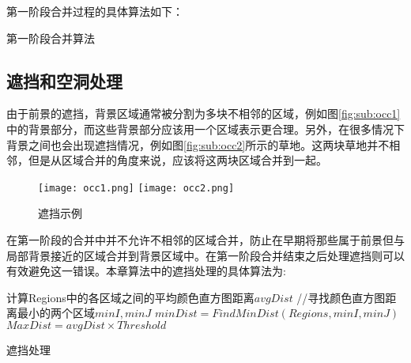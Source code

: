 第一阶段合并过程的具体算法如下：



\renewcommand{\algorithmcfname}{算法}
\begin{algorithm}[htb]
\LinesNumbered
{}

\label{alg:algMergeP1}
\caption{第一阶段合并算法}
\end{algorithm}

\subsection{遮挡和空洞处理}
\label{subsec:mergeP2}

由于前景的遮挡，背景区域通常被分割为多块不相邻的区域，例如图\ref{fig:sub:occ1}中的背景部分，而这些背景部分应该用一个区域表示更合理。另外，在很多情况下背景之间也会出现遮挡情况，例如图\ref{fig:sub:occ2}所示的草地。这两块草地并不相邻，但是从区域合并的角度来说，应该将这两块区域合并到一起。
\begin{figure}[htb]
  \centering%
    {\texttt{[image: occ1.png]}}%
 \hspace{1em}%
      {\texttt{[image: occ2.png]}}
      
  \caption{遮挡示例}
  \label{fig:occ}
\end{figure}
在第一阶段的合并中并不允许不相邻的区域合并，防止在早期将那些属于前景但与局部背景接近的区域合并到背景区域中。在第一阶段合并结束之后处理遮挡则可以有效避免这一错误。本章算法中的遮挡处理的具体算法为:

\renewcommand{\algorithmcfname}{算法}
\begin{algorithm}[htb]
\LinesNumbered
{}
    计算Regions中的各区域之间的平均颜色直方图距离$avgDist$\;
    //寻找颜色直方图距离最小的两个区域$minI,minJ$\;
    $minDist = FindMinDist(Regions,minI,minJ)$\;
    $MaxDist = avgDist \times Threshold$\;


\label{alg:algMergeP2}
\caption{遮挡处理}
\end{algorithm}
\par

